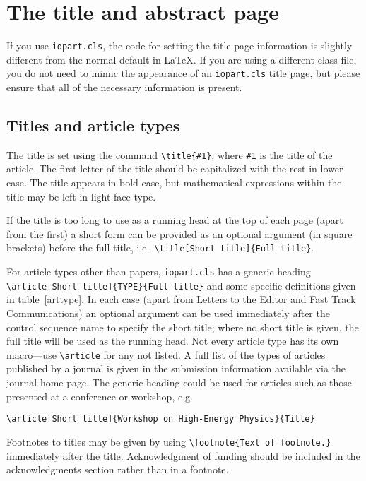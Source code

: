 \documentclass[12pt]{iopart}
\begin{document}
\section{The title and abstract page} 
If you use \verb"iopart.cls", the code for setting the title page information is slightly different from
the normal default in \LaTeX.  If you are using a different class file, you do not need to mimic the appearance of
an \verb"iopart.cls" title page, but please ensure that all of the necessary information is present.

\subsection{Titles and article types}
The title is set using the command
\verb"\title{#1}", where \verb"#1" is the title of the article. The
first letter 
of the title should be capitalized with the rest in lower case. 
The title appears in bold case, but mathematical expressions within the title may be left in light-face type. 

If the title is too long to use as a running head at the top of each page (apart from the
first) a short
form can be provided as an optional argument (in square brackets)
before the full title, i.e.\ \verb"\title[Short title]{Full title}".

For article types other than papers, \verb"iopart.cls"
has a generic heading \verb"\article[Short title]{TYPE}{Full title}" 
and some specific definitions given in table~\ref{arttype}. In each case (apart from Letters
to the Editor and Fast Track Communications) an 
optional argument can be used immediately after the control sequence name
to specify the short title; where no short title is given, the full title
will be used as the running head.  Not every article type has its own macro---use \verb"\article" for
any not listed.  A full list of the types of articles published by a journal is given
in the submission information available via the journal home page.
The generic heading could be used for 
articles such as those presented at a conference or workshop, e.g.
\small\begin{verbatim}
\article[Short title]{Workshop on High-Energy Physics}{Title}
\end{verbatim}\normalsize
Footnotes to titles may be given by using \verb"\footnote{Text of footnote.}" immediately after the title.
Acknowledgment of funding should be included in the acknowledgments section rather than in a footnote.
\end{document}
